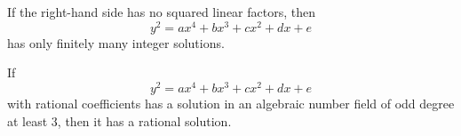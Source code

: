 \begin{proposition}
    If the right-hand side has no squared linear factors, then
\[
    y^2=ax^4+bx^3+cx^2+dx+e
\]
    has only finitely many integer solutions.
\end{proposition}

\begin{proposition}
    If
\[
    y^2=ax^4+bx^3+cx^2+dx+e
\]
    with rational coefficients has a solution in an algebraic number field of odd degree at least $3$, then it has a rational solution.
\end{proposition}
